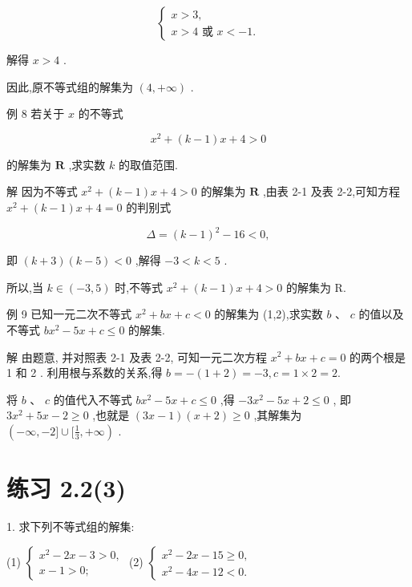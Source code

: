 \documentclass[10pt]{article}
\begin{document}
\[
\left\{  \begin{array}{l} x > 3, \\  x > 4\text{ 或 }x <  - 1. \end{array}\right.
\]

解得 \(x > 4\) .

因此,原不等式组的解集为 \(\left( {4, + \infty }\right)\) .

例 8 若关于 \(x\) 的不等式

\[
{x}^{2} + \left( {k - 1}\right) x + 4 > 0
\]

的解集为 \(\mathbf{R}\) ,求实数 \(k\) 的取值范围.

解 因为不等式 \({x}^{2} + \left( {k - 1}\right) x + 4 > 0\) 的解集为 \(\mathbf{R}\) ,由表 2-1 及表 2-2,可知方程 \({x}^{2} + \left( {k - 1}\right) x + 4 = 0\) 的判别式

\[
\Delta  = {\left( k - 1\right) }^{2} - {16} < 0,
\]

即 \(\left( {k + 3}\right) \left( {k - 5}\right)  < 0\) ,解得 \(- 3 < k < 5\) .

所以,当 \(k \in  \left( {-3,5}\right)\) 时,不等式 \({x}^{2} + \left( {k - 1}\right) x + 4 > 0\) 的解集为 R.

例 9 已知一元二次不等式 \({x}^{2} + {bx} + c < 0\) 的解集为 (1,2),求实数 \(b\text{ 、 }c\) 的值以及不等式 \(b{x}^{2} - {5x} + c \leq  0\) 的解集.

解 由题意, 并对照表 2-1 及表 2-2, 可知一元二次方程 \({x}^{2} + {bx} + c = 0\) 的两个根是 1 和 2 . 利用根与系数的关系,得 \(b =  - \left( {1 + 2}\right)  =  - 3,c = 1 \times  2 = 2.\)

将 \(b\text{ 、 }c\) 的值代入不等式 \(b{x}^{2} - {5x} + c \leq  0\) ,得 \(- 3{x}^{2} - {5x} + 2 \leq  0\) , 即 \(3{x}^{2} + {5x} - 2 \geq  0\) ,也就是 \(\left( {{3x} - 1}\right) \left( {x + 2}\right)  \geq  0\) ,其解集为 \(\left( {-\infty , - 2\rbrack \cup \lbrack \frac{1}{3}, + \infty }\right)\) .

\section*{练习 2.2(3)}

1. 求下列不等式组的解集:

(1) \(\left\{  \begin{array}{l} {x}^{2} - {2x} - 3 > 0, \\  x - 1 > 0; \end{array}\right.\) (2) \(\left\{  \begin{array}{l} {x}^{2} - {2x} - {15} \geq  0, \\  {x}^{2} - {4x} - {12} < 0. \end{array}\right.\)
\end{document}
